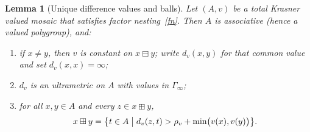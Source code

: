 \documentclass[11pt]{amsart}
\theoremstyle{plain}
\newtheorem{lemma}[theorem]{Lemma}
\theoremstyle{definition}
\theoremstyle{remark}
\begin{document}
\begin{lemma}[Unique difference values and balls]
\label{lem:unique-diff}
Let \((A,v)\) be a total Krasner valued mosaic that satisfies factor nesting~\eqref{fn}.
Then \(A\) is associative (hence a valued polygroup), and:
\begin{enumerate}[label=(\roman*)]
\item\label{ud-i} if \(x\neq y\), then \(v\) is constant on \(x\boxminus y\); write \(d_v(x,y)\) for that common value and set \(d_v(x,x)=\infty\);
\item\label{ud-ii} \(d_v\) is an ultrametric on \(A\) with values in \(\Gamma_\infty\);
\item\label{ud-iii} for all \(x,y\in A\) and every \(z\in x\boxplus y\),
\[
x\boxplus y
=\bigl\{t\in A \bigm| d_v(z,t)>\rho_v+\min\bigl(v(x),v(y)\bigr)\bigr\}.
\]
\end{enumerate}
\end{lemma}
\end{document}
